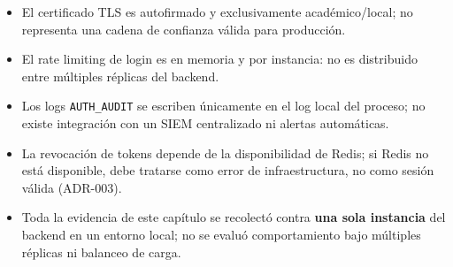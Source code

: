 \begin{itemize}[nosep]
  \item El certificado TLS es autofirmado y exclusivamente acad\'emico/local;
    no representa una cadena de confianza v\'alida para producci\'on.
  \item El rate limiting de login es en memoria y por instancia: no es
    distribuido entre m\'ultiples r\'eplicas del backend.
  \item Los logs \texttt{AUTH_AUDIT} se escriben \'unicamente en el log
    local del proceso; no existe integraci\'on con un SIEM centralizado ni
    alertas autom\'aticas.
  \item La revocaci\'on de tokens depende de la disponibilidad de Redis; si
    Redis no est\'a disponible, debe tratarse como error de infraestructura,
    no como sesi\'on v\'alida (ADR-003).
  \item Toda la evidencia de este cap\'itulo se recolect\'o contra
    \textbf{una sola instancia} del backend en un entorno local; no se
    evalu\'o comportamiento bajo m\'ultiples r\'eplicas ni balanceo de
    carga.
\end{itemize}
